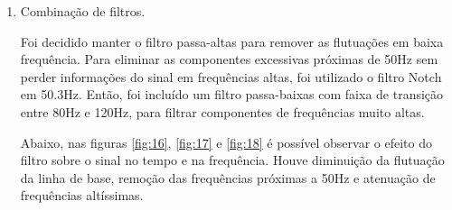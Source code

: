 \documentclass[12pt,letterpaper]{article}
\begin{document}
\begin{enumerate}[label=(\alph*)]
    
    \item Combinação de filtros.
    
    Foi decidido manter o filtro passa-altas para remover as flutuações em baixa frequência. Para eliminar as componentes excessivas próximas de 50Hz sem perder informações do sinal em frequências altas, foi utilizado o filtro Notch em 50.3Hz. Então, foi incluído um filtro passa-baixas com faixa de transição entre 80Hz e 120Hz, para filtrar componentes de frequências muito altas.
    
    Abaixo, nas figuras \ref{fig:16}, \ref{fig:17} e \ref{fig:18} é possível observar o efeito do filtro sobre o sinal no tempo e na frequência. Houve diminuição da flutuação da linha de base, remoção das frequências próximas a 50Hz e atenuação de frequências altíssimas.
    

\end{enumerate}
\end{document}
